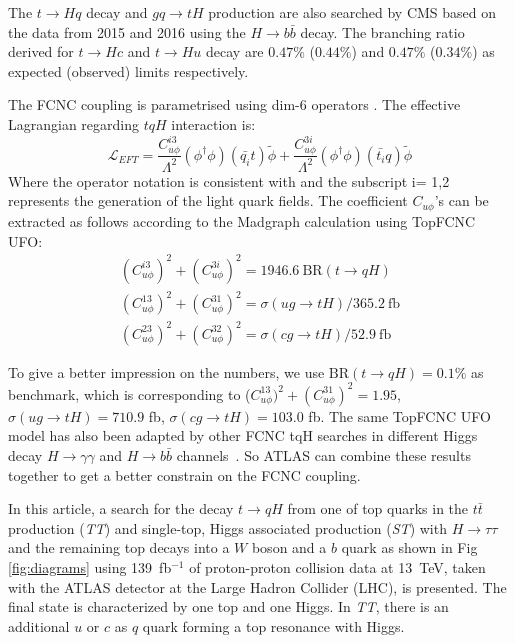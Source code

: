 The $t\to Hq$ decay and $gq\to tH$ production are also searched by CMS based on the data from 2015 and 2016\cite{CMS-TOP-17-003} using the $H\to b\bar{b}$ decay. The branching ratio derived for $t\to Hc$ and $t\to Hu$ decay are $0.47\%$ ($0.44\%$) and $0.47\%$ ($0.34\%$) as expected (observed) limits respectively.

The FCNC coupling is parametrised using dim-6 operators \cite{fcnc_production_theory}. The effective Lagrangian regarding $tqH$ interaction is:
%
\begin{equation}
\mathcal{L}_{EFT} = \frac{C^{i3}_{u\phi}}{\Lambda^{2}}(\phi^{\dagger}\phi)(\bar{q_{i}}t)\tilde{\phi} + \frac{C^{3i}_{u\phi}}{\Lambda^{2}}(\phi^{\dagger}\phi)(\bar{t_{i}}q)\tilde{\phi}
\label{eq:eq01}
\end{equation}
%
Where the operator notation is consistent with \cite{fcnc_production_theory} and the subscript i= 1,2 represents the generation of the light quark fields. 
The coefficient $C_{u\phi}$'s can be extracted as follows according to the Madgraph calculation using TopFCNC UFO:
\begin{equation}
\begin{array}{l}
(C^{i3}_{u\phi})^2 + (C^{3i}_{u\phi})^2 = 1946.6~\text{BR}(t\to qH)\\
(C^{13}_{u\phi})^2 + (C^{31}_{u\phi})^2 = \sigma(ug\to tH)/365.2~\text{fb}\\
(C^{23}_{u\phi})^2 + (C^{32}_{u\phi})^2 = \sigma(cg\to tH)/52.9~\text{fb}
\end{array}
\label{eq:eq02}
\end{equation}

To give a better impression on the numbers, we use $\text{BR}(t\to qH)=0.1\%$ as benchmark, which is corresponding to ($C^{13}_{u\phi})^2 + (C^{31}_{u\phi})^2=1.95$, $\sigma(ug\to tH)=710.9$ fb, $\sigma(cg\to tH)=103.0$ fb. The same TopFCNC UFO model has also been adapted by other FCNC tqH searches in different Higgs decay $H\rightarrow\gamma\gamma$ and $H\rightarrow b\bar b$
channels~\cite{tqHgammagamma,tqHbb}. So ATLAS can combine these results together to get a better constrain on the FCNC coupling.  

In this article, a search for the decay $t\to qH$ from one of top quarks in the $t\bar{t}$ production (\textit{TT}) and single-top, Higgs associated production (\textit{ST}) with $H\to\tau\tau$ and the remaining top decays into a $W$ boson and a $b$ quark as shown in Fig \ref{fig:diagrams} using 139~fb$^{-1}$ of proton-proton collision data at 13~TeV, taken with the ATLAS detector at the Large Hadron Collider (LHC), is presented. The final state is characterized by one top and one Higgs. In \textit{TT}, there is an additional $u$ or $c$ as $q$ quark forming a top resonance with Higgs.

